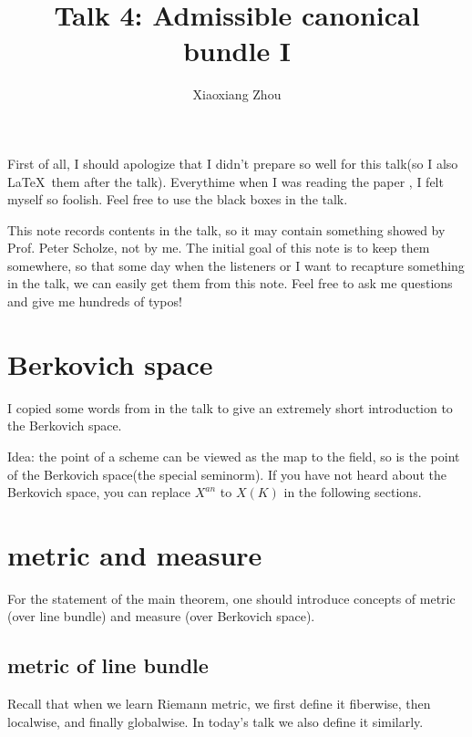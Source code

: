 \documentclass[reqno,11pt]{amsart}
\numberwithin{equation}{section}
\theoremstyle{plain}
\theoremstyle{plain}
\numberwithin{equation}{section}
\theoremstyle{remark}
\begin{document}
\date{}

\title
{Talk 4: Admissible canonical bundle I
}


\author{Xiaoxiang Zhou}
\address{School of Mathematical Sciences\\
University of Bonn\\
Bonn, 53115\\ Germany\\} 




\maketitle
\tableofcontents

First of all, I should apologize that I didn't prepare so well for this talk(so I also \LaTeX$\,$ them after the talk). Everythime when I was reading the paper \cite{yuan2021arithmetic}, I felt myself so foolish. Feel free to use the black boxes in the talk. 

This note records contents in the talk, so it may contain something showed by Prof. Peter Scholze, not by me. The initial goal of this note is to keep them somewhere, so that some day when the listeners or I want to recapture something in the talk, we can easily get them from this note. Feel free to ask me questions and give me hundreds of typos!

\section{Berkovich space}

I copied some words from \cite[3.1.1]{yuan2021arithmetic} in the talk to give an extremely short introduction to the Berkovich space. 

Idea: the point of a scheme can be viewed as the map to the field, so is the point of the Berkovich space(the special seminorm). If you have not heard about the Berkovich space, you can replace $X^{an}$ to $X(K)$ in the following sections.

\section{metric and measure}
For the statement of the main theorem, one should introduce concepts of metric (over line bundle) and measure (over Berkovich space).

\subsection{metric of line bundle}
Recall that when we learn Riemann metric, we first define it fiberwise, then localwise, and finally globalwise. In today's talk we also define it similarly.
\end{document}
